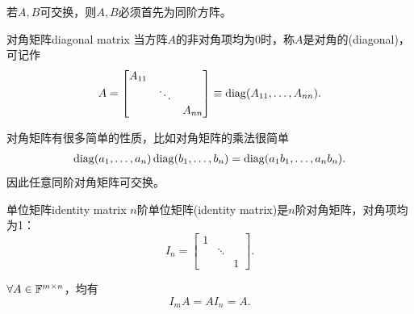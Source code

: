\begin{corollary}
	若$A,B$可交换，则$A,B$必须首先为同阶方阵。
\end{corollary}

\begin{definition}
	{对角矩阵}{diagonal matrix}
	当方阵$A$的非对角项均为0时，称$A$是对角的(diagonal)，可记作
	\begin{equation}
		A = \begin{bmatrix}
			A_{11}\\ &\ddots\\ &&A_{nn}
		\end{bmatrix} \equiv \operatorname{diag}(A_{11},\ldots,A_{nn}).
	\end{equation}
\end{definition}

\begin{remark}
	对角矩阵有很多简单的性质，比如对角矩阵的乘法很简单
	\begin{align}
		\operatorname{diag}(a_1,\ldots,a_n)\operatorname{diag}(b_1,\ldots,b_n) = \operatorname{diag}(a_1b_1,\ldots,a_nb_n).
	\end{align}
	因此任意同阶对角矩阵可交换。
\end{remark}

\begin{definition}{单位矩阵}{identity matrix}
	$n$阶单位矩阵(identity matrix)是$n$阶对角矩阵，对角项均为1：
	\begin{equation}\label{eq:la-identity-matrix}
		I_n = \begin{bmatrix}
		1&\\ &\ddots\\&&1
		\end{bmatrix}.
	\end{equation}
\end{definition}

\begin{corollary}
	$\forall A \in \mathbb{F}^{m\times n}$，均有
	\begin{equation}\label{eq:la-identity-action}
		I_mA = AI_n = A.
	\end{equation}
\end{corollary}

